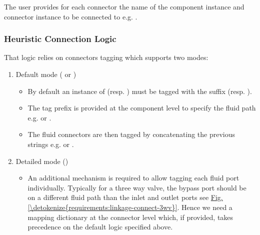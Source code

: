\documentclass[letterpaper,10pt, openany,english]{sphinxmanual}
\begin{document}
The user provides for each connector the name of the component instance and connector instance to be connected to e.g. .


\subsubsection{Heuristic Connection Logic}
\label{\detokenize{requirements:heuristic-connection-logic}}\label{\detokenize{requirements:sec-heuristic}}
That logic relies on connectors tagging which supports two modes:
\begin{enumerate}
%
\item {} 
Default mode ( or )
\begin{itemize}
\item {} 
By default an instance of  (resp. ) must be tagged with the suffix  (resp. ).

\item {} 
The tag prefix is provided at the component level to specify the fluid path e.g.  or .

\item {} 
The fluid connectors are then tagged by concatenating the previous strings e.g.  or .

\end{itemize}

\item {} 
Detailed mode ()
\begin{itemize}
\item {} 
An additional mechanism is required to allow tagging each fluid port individually. Typically for a three way valve, the bypass port should be on a different fluid path than the inlet and outlet ports see \hyperref[\detokenize{requirements:linkage-connect-3wv}]{Fig.\@ \ref{\detokenize{requirements:linkage-connect-3wv}}}. Hence we need a mapping dictionary at the connector level which, if provided, takes precedence on the default logic specified above.


\end{itemize}
\end{enumerate}
\end{document}
